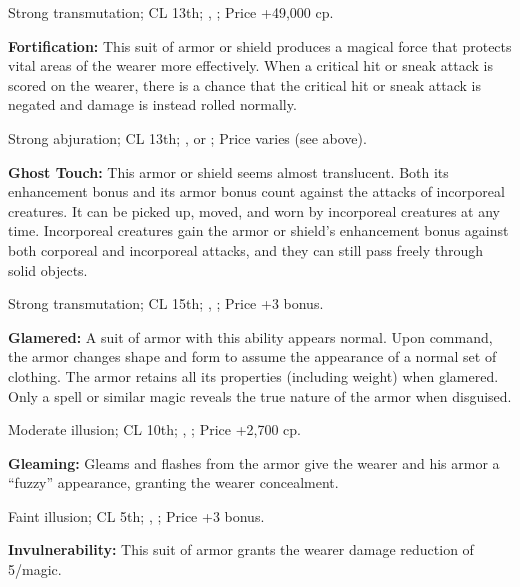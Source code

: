 Strong transmutation; CL 13th; , ; Price +49,000 cp. 

\textbf{Fortification:} This suit of armor or shield produces a magical force that protects vital areas of the wearer more effectively. When a critical hit or sneak attack is scored on the wearer, there is a chance that the critical hit or sneak attack is negated and damage is instead rolled normally.


Strong abjuration; CL 13th; ,  or ; Price varies (see above).

\textbf{Ghost Touch:} This armor or shield seems almost translucent. Both its enhancement bonus and its armor bonus count against the attacks of incorporeal creatures. It can be picked up, moved, and worn by incorporeal creatures at any time. Incorporeal creatures gain the armor or shield's enhancement bonus against both corporeal and incorporeal attacks, and they can still pass freely through solid objects.

Strong transmutation; CL 15th; , ; Price +3 bonus.

\textbf{Glamered:} A suit of armor with this ability appears normal. Upon command, the armor changes shape and form to assume the appearance of a normal set of clothing. The armor retains all its properties (including weight) when glamered. Only a  spell or similar magic reveals the true nature of the armor when disguised.

Moderate illusion; CL 10th; , ; Price +2,700 cp.

\textbf{Gleaming:} Gleams and flashes from the armor give the wearer and his armor a ``fuzzy'' appearance, granting the wearer concealment.

Faint illusion; CL 5th; , ; Price +3 bonus.

\textbf{Invulnerability:} This suit of armor grants the wearer damage reduction of 5/magic.

